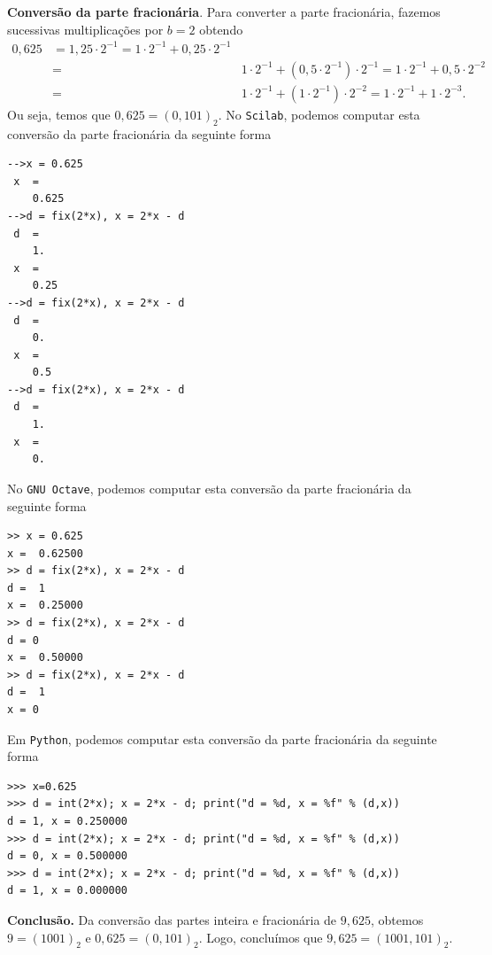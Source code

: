 \begin{ex}
{\bf Conversão da parte fracionária}. Para converter a parte fracionária, fazemos sucessivas multiplicações por $b=2$ obtendo
\begin{eqnarray*}
  0,625 &= 1,25\cdot 2^{-1} = 1\cdot 2^{-1} + 0,25\cdot 2^{-1}\\
  &=& 1\cdot 2^{-1} + (0,5\cdot 2^{-1})\cdot 2^{-1} = 1\cdot 2^{-1} + 0,5\cdot 2^{-2}\\
  &=& 1\cdot 2^{-1} + (1\cdot 2^{-1})\cdot 2^{-2} = 1\cdot 2^{-1} + 1\cdot 2^{-3}.
\end{eqnarray*}
Ou seja, temos que $0,625 = (0,101)_2$.
\ifisscilab
No \verb+Scilab+, podemos computar esta conversão da parte fracionária da seguinte forma
\begin{verbatim}
-->x = 0.625
 x  =
    0.625
-->d = fix(2*x), x = 2*x - d
 d  =
    1.
 x  =
    0.25
-->d = fix(2*x), x = 2*x - d
 d  =
    0.
 x  =
    0.5
-->d = fix(2*x), x = 2*x - d
 d  =
    1.
 x  =
    0.
\end{verbatim}
\fi
\ifisoctave
No \verb+GNU Octave+, podemos computar esta conversão da parte fracionária da seguinte forma
\begin{verbatim}
>> x = 0.625
x =  0.62500
>> d = fix(2*x), x = 2*x - d
d =  1
x =  0.25000
>> d = fix(2*x), x = 2*x - d
d = 0
x =  0.50000
>> d = fix(2*x), x = 2*x - d
d =  1
x = 0
\end{verbatim}
\fi
\ifispython
Em \verb+Python+, podemos computar esta conversão da parte fracionária da seguinte forma
\begin{verbatim}
>>> x=0.625
>>> d = int(2*x); x = 2*x - d; print("d = %d, x = %f" % (d,x))
d = 1, x = 0.250000
>>> d = int(2*x); x = 2*x - d; print("d = %d, x = %f" % (d,x))
d = 0, x = 0.500000
>>> d = int(2*x); x = 2*x - d; print("d = %d, x = %f" % (d,x))
d = 1, x = 0.000000
\end{verbatim}
\fi

{\bf Conclusão.} Da conversão das partes inteira e fracionária de $9,625$, obtemos $9 = (1001)_2$ e $0,625 = (0,101)_2$. Logo, concluímos que $9,625 = (1001,101)_2$.
\end{ex}

